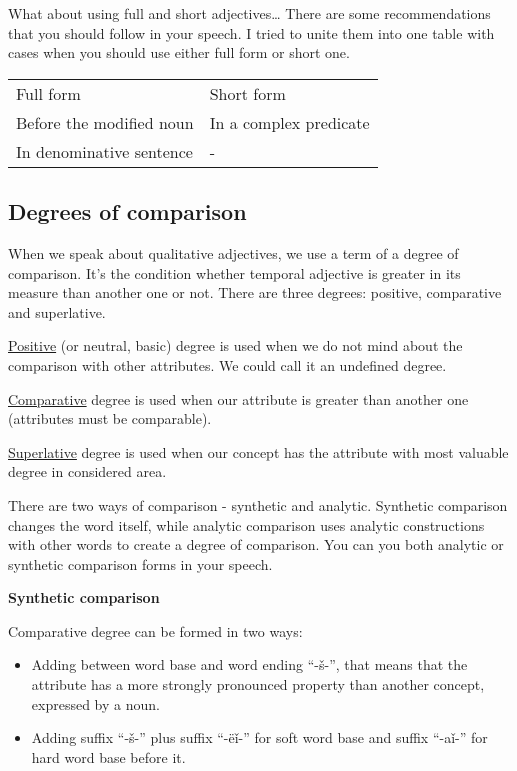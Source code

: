 What about using full and short adjectives… There are some recommendations that you should follow in your speech. I tried to unite them into one table with cases when you should use either full form or short one.

\begin{table}
	\begin{tabular}{ll}
		Full form & Short form \\
		Before the modified noun & In a complex predicate \\
		In denominative sentence & - \\
	\end{tabular}
\end{table}


\subsection{Degrees of comparison}

When we speak about qualitative adjectives, we use a term of a degree of comparison. It’s the condition whether temporal adjective is greater in its measure than another one or not. There are three degrees: positive, comparative and superlative.

\underline{Positive} (or neutral, basic) degree is used when we do not mind about the comparison with other attributes. We could call it an undefined degree.

\underline{Comparative} degree is used when our attribute is greater than another one (attributes must be comparable).  

\underline{Superlative} degree is used when our concept has the attribute with most valuable degree in considered area.

There are two ways of comparison - synthetic and analytic. Synthetic comparison changes the word itself, while analytic comparison uses analytic constructions with other words to create a degree of comparison. You can you both analytic or synthetic comparison forms in your speech.

\textbf{Synthetic comparison}

Comparative degree can be formed in two ways: 

\begin{itemize}
	\item Adding between word base and word ending “-š-”, that means that the attribute has a more strongly pronounced property than another concept, expressed by a noun.
	\item Adding suffix “-š-” plus suffix “-ëǐ-” for soft word base and suffix “-aǐ-” for hard word base before it.
\end{itemize}

